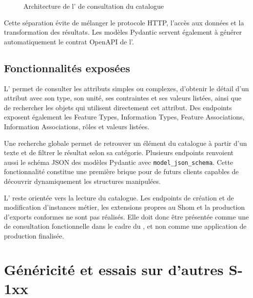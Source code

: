 \begin{figure}[H]
\centering
{}
\caption{Architecture de l' de consultation du catalogue}
\label{fig:architecture-api-s100}
\end{figure}

Cette séparation évite de mélanger le protocole HTTP, l'accès aux données et la transformation des résultats. Les modèles Pydantic servent également à générer automatiquement le contrat OpenAPI de l'.

\subsection{Fonctionnalités exposées}

L' permet de consulter les attributs simples ou complexes, d'obtenir le détail d'un attribut avec son type, son unité, ses contraintes et ses valeurs listées, ainsi que de rechercher les objets qui utilisent directement cet attribut. Des endpoints exposent également les Feature Types, Information Types, Feature Associations, Information Associations, rôles et valeurs listées.

Une recherche globale permet de retrouver un élément du catalogue à partir d'un texte et de filtrer le résultat selon sa catégorie. Plusieurs endpoints renvoient aussi le schéma JSON des modèles Pydantic avec \texttt{model\_json\_schema}. Cette fonctionnalité constitue une première brique pour de futurs clients capables de découvrir dynamiquement les structures manipulées.

L' reste orientée vers la lecture du catalogue. Les endpoints de création et de modification d'instances métier, les extensions propres au Shom et la production d'exports conformes ne sont pas réalisés. Elle doit donc être présentée comme une  de consultation fonctionnelle dans le cadre du , et non comme une application de production finalisée.

\section{Généricité et essais sur d'autres S-1xx}

